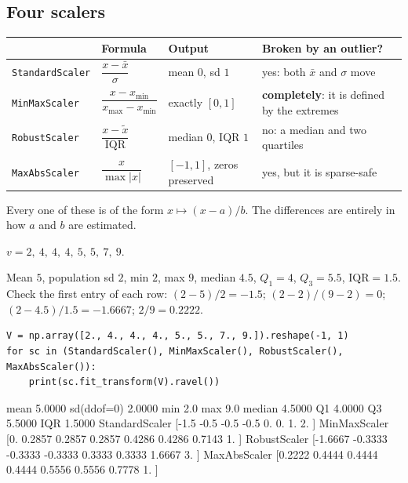 \documentclass[11pt]{article}
\begin{document}
\subsection{Four scalers}
\label{sec:fourscalers}

\begin{center}
\begin{tabular}{@{}llll@{}}
\toprule
& \textbf{Formula} & \textbf{Output} & \textbf{Broken by an outlier?}\\
\midrule
\texttt{StandardScaler} & $\dfrac{x-\bar x}{\sigma}$ &
  mean $0$, sd $1$ & yes: both $\bar x$ and $\sigma$ move\\[8pt]
\texttt{MinMaxScaler} & $\dfrac{x-x_{\min}}{x_{\max}-x_{\min}}$ &
  exactly $[0,1]$ & \textbf{completely}: it is defined by the extremes\\[8pt]
\texttt{RobustScaler} & $\dfrac{x-\tilde x}{\mathrm{IQR}}$ &
  median $0$, IQR $1$ & no: a median and two quartiles\\[8pt]
\texttt{MaxAbsScaler} & $\dfrac{x}{\max|x|}$ &
  $[-1,1]$, zeros preserved & yes, but it is sparse-safe\\
\bottomrule
\end{tabular}
\end{center}

Every one of these is of the form $x \mapsto (x-a)/b$. The differences are
entirely in how $a$ and $b$ are estimated.

\begin{worked}
$v = 2,\ 4,\ 4,\ 4,\ 5,\ 5,\ 7,\ 9$.

Mean $5$, population sd $2$, min $2$, max $9$, median $4.5$, $Q_1 = 4$,
$Q_3 = 5.5$, $\mathrm{IQR} = 1.5$. Check the first entry of each row:
$(2-5)/2 = -1.5$; $(2-2)/(9-2) = 0$; $(2-4.5)/1.5 = -1.6667$; $2/9 = 0.2222$.
\end{worked}

\begin{lstlisting}
V = np.array([2., 4., 4., 4., 5., 5., 7., 9.]).reshape(-1, 1)
for sc in (StandardScaler(), MinMaxScaler(), RobustScaler(), MaxAbsScaler()):
    print(sc.fit_transform(V).ravel())
\end{lstlisting}
\begin{codeout}
mean 5.0000  sd(ddof=0) 2.0000  min 2.0  max 9.0
median 4.5000  Q1 4.0000  Q3 5.5000  IQR 1.5000
StandardScaler [-1.5 -0.5 -0.5 -0.5  0.   0.   1.   2. ]
MinMaxScaler   [0.     0.2857 0.2857 0.2857 0.4286 0.4286 0.7143 1.    ]
RobustScaler   [-1.6667 -0.3333 -0.3333 -0.3333  0.3333  0.3333  1.6667  3.    ]
MaxAbsScaler   [0.2222 0.4444 0.4444 0.4444 0.5556 0.5556 0.7778 1.    ]
\end{codeout}
\end{document}
